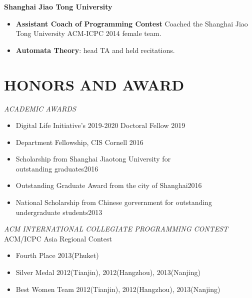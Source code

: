 \documentclass[margin, 10pt]{res} %
\begin{document}
\begin{resume}
\textbf{Shanghai Jiao Tong University}
\begin{itemize}
\item \textbf{Assistant Coach of Programming Contest} Coached the Shanghai Jiao Tong University ACM-ICPC 2014 female team.
\item \textbf{Automata Theory}: head TA and held recitations.
\end{itemize}




\section{HONORS AND AWARD}

{\sl ACADEMIC AWARDS}\\
\begin{itemize}
\item Digital Life Initiative's 2019-2020 Doctoral Fellow \hfill 2019
\item Department Fellowship, CIS Cornell \hfill 2016
\item Scholarship from Shanghai Jiaotong University for\\ outstanding graduates\hfill 2016
\item Outstanding Graduate Award from the city of Shanghai\hfill 2016
\item National Scholarship from Chinese gorvernment for outstanding\\ undergraduate students\hfill 2013 
\end{itemize}



{\sl ACM INTERNATIONAL COLLEGIATE PROGRAMMING CONTEST} \\
ACM/ICPC Asia Regional Contest 

\begin{itemize} \itemsep -2pt %
\item Fourth Place \hfill 2013(Phuket)
\item Silver Medal \hfill 2012(Tianjin), 2012(Hangzhou), 2013(Nanjing) 
\item Best Women Team \hfill 2012(Tianjin), 2012(Hangzhou), 2013(Nanjing) 
\end{itemize}
 
\end{resume}
\end{document}
